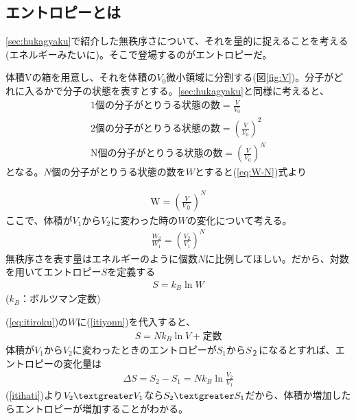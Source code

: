 \subsection{エントロピーとは}
\ref{sec:hukagyaku}で紹介した無秩序さについて、それを量的に捉えることを考える(エネルギーみたいに)。そこで登場するのがエントロピーだ。\par
体積Vの箱を用意し、それを体積の$V_0$微小領域に分割する(図\ref{fig:V})。分子がどれに入るかで分子の状態を表すとする。\ref{sec:hukagyaku}と同様に考えると、
\begin{align}
  \mathrm{1個の分子がとりうる状態の数} = \frac{V}{V_0}\\
	\mathrm{2個の分子がとりうる状態の数} = \left(\frac{V}{V_0}\right)^2\\
\mathrm{N個の分子がとりうる状態の数} = \left(\frac{V}{V_0}\right)^N \label{eq:W-N}
\end{align}
となる。$N$個の分子がとりうる状態の数を$W$とすると(\ref{eq:W-N})式より

\begin{align}
  \mathrm{W} =\left(\frac{V}{V_０}\right)^N  \label{itiyonn}
\end{align}
ここで、体積が$V_1$から$V_2$に変わった時の$W$の変化について考える。
\begin{align}
  \frac{W_2}{W_1}=\left(\frac{V_2}{V_1}\right)^N
\end{align}
無秩序さを表す量はエネルギーのように個数$N$に比例してほしい。だから、対数を用いてエントロピー$S$を定義する
\begin{align}
  S=k_B \ln{W} \label{eq:itiroku}
\end{align}
($k_B$：ボルツマン定数)\par
(\ref{eq:itiroku})の$W$に(\ref{itiyonn})を代入すると、
\begin{align}
  S=N k_B \ln{V}+定数  \label{snkb}
\end{align}
体積が$V_1$から$V_2$に変わったときのエントロピーが$S_1$から$S_２$になるとすれば、エントロピーの変化量は
\begin{align}
 \Delta S=S_2-S_1=N k_B \ln{\frac{V_2}{V_1}}  \label{itihati}
\end{align}
(\ref{itihati})より$V_2\textgreater V_1$なら$S_2\textgreater S_1$だから、体積か増加したらエントロピーが増加することがわかる。
